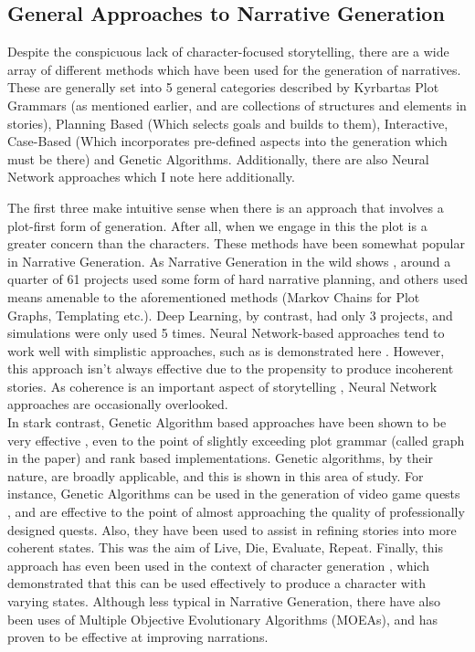 \documentclass[12pt]{article}
\begin{document}
\subsection{General Approaches to Narrative Generation}
Despite the conspicuous lack of character-focused storytelling, there are a wide array of different methods which have been used for the generation of narratives. These are generally set into 5 general categories described by Kyrbartas\cite{KybartasGenerationTechniques} \: Plot Grammars (as mentioned earlier, and are collections of structures and elements in stories), Planning Based (Which selects goals and builds to them), Interactive, Case-Based (Which incorporates pre-defined aspects into the generation which must be there) and Genetic Algorithms. Additionally, there are also Neural Network approaches which I note here additionally. 

The first three make intuitive sense when there is an approach that involves a plot-first form of generation. After all, when we engage in this the plot is a greater concern than the characters. These methods have been somewhat popular in Narrative Generation. As Narrative Generation in the wild shows \cite{van-stegeren-theune-2019-narrative}, around a quarter of 61 projects used some form of hard narrative planning, and others used means amenable to the aforementioned methods (Markov Chains for Plot Graphs, Templating etc.). Deep Learning, by contrast, had only 3 projects, and simulations were only used 5 times. Neural Network-based approaches tend to work well with simplistic approaches, such as is demonstrated here \cite{NeuralNetworkOne}. However, this approach isn't always effective due to the propensity to produce incoherent stories. As coherence is an important aspect of storytelling \cite{sagarkar-etal-2018-quality}, Neural Network approaches are occasionally overlooked. \\

In stark contrast, Genetic Algorithm based approaches have been shown to be very effective \cite{mcintyre-lapata-2010-plot}, even to the point of slightly exceeding plot grammar (called graph in the paper) and rank based implementations. Genetic algorithms, by their nature, are broadly applicable, and this is shown in this area of study. For instance, Genetic Algorithms can be used in the generation of video game quests \cite{questgeneration}, and are effective to the point of almost approaching the quality of professionally designed quests. Also, they have been used to assist in refining stories into more coherent states. This was the aim of Live, Die, Evaluate, Repeat\cite{Riegl2018LiveDE}. Finally, this approach has even been used in the context of character generation \cite{charactergeneration}, which demonstrated that this can be used effectively to produce a character with varying states. Although less typical in Narrative Generation, there have also been uses of Multiple Objective Evolutionary Algorithms (MOEAs)\cite{MOEANarrative}, and has proven to be effective at improving narrations.
\end{document}
